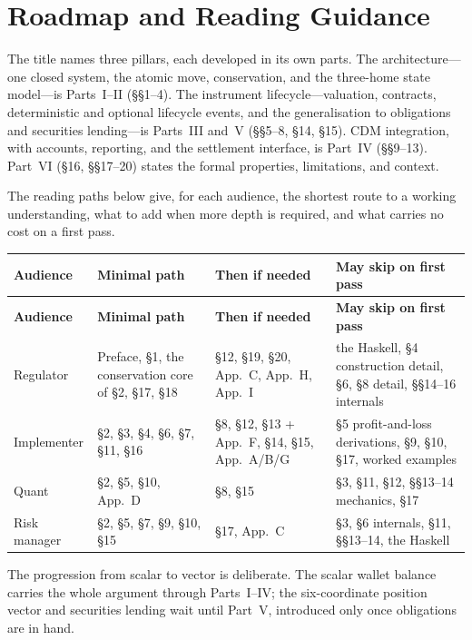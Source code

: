 \section*{Roadmap and Reading Guidance}

The title names three pillars, each developed in its own parts. The architecture---one
closed system, the atomic move, conservation, and the three-home state model---is
Parts~I--II (\S\S1--4). The instrument lifecycle---valuation, contracts, deterministic and
optional lifecycle events, and the generalisation to obligations and securities
lending---is Parts~III and~V (\S\S5--8, \S14, \S15). CDM integration, with accounts,
reporting, and the settlement interface, is Part~IV (\S\S9--13). Part~VI (\S16, \S\S17--20)
states the formal properties, limitations, and context.

The reading paths below give, for each audience, the shortest route to a working
understanding, what to add when more depth is required, and what carries no cost on a first
pass.

\begin{longtable}{@{}p{}p{}p{}p{}@{}}
\toprule
\textbf{Audience} & \textbf{Minimal path} & \textbf{Then if needed} & \textbf{May skip on first pass} \\
\midrule
\endfirsthead
\toprule
\textbf{Audience} & \textbf{Minimal path} & \textbf{Then if needed} & \textbf{May skip on first pass} \\
\midrule
\endhead
\bottomrule
\endfoot
Regulator &
Preface, \S1, the conservation core of \S2, \S17, \S18 &
\S12, \S19, \S20, App.~C, App.~H, App.~I &
the Haskell, \S4 construction detail, \S6, \S8 detail, \S\S14--16 internals \\
\addlinespace
Implementer &
\S2, \S3, \S4, \S6, \S7, \S11, \S16 &
\S8, \S12, \S13 + App.~F, \S14, \S15, App.~A/B/G &
\S5 profit-and-loss derivations, \S9, \S10, \S17, worked examples \\
\addlinespace
Quant &
\S2, \S5, \S10, App.~D &
\S8, \S15 &
\S3, \S11, \S12, \S\S13--14 mechanics, \S17 \\
\addlinespace
Risk manager &
\S2, \S5, \S7, \S9, \S10, \S15 &
\S17, App.~C &
\S3, \S6 internals, \S11, \S\S13--14, the Haskell \\
\bottomrule
\end{longtable}

The progression from scalar to vector is deliberate. The scalar wallet balance carries the
whole argument through Parts~I--IV; the six-coordinate position vector and securities
lending wait until Part~V, introduced only once obligations are in hand.
